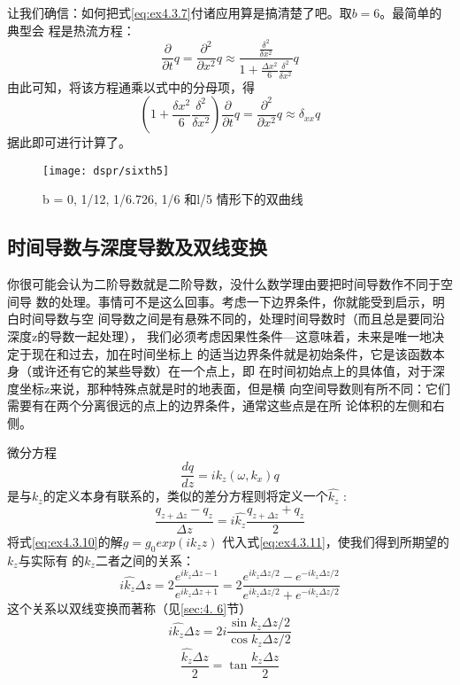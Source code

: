 让我们确信：如何把式\ref{eq:ex4.3.7}付诸应用算是搞清楚了吧。取$b
= 6$。最简单的典型会
程是热流方程：
\begin{equation}
\frac{\partial}{\partial t}q=
\frac{\partial^2}{\partial x^2}q\approx
\frac{\frac{\delta^2}{\delta x^2}}{1+\frac{\Delta x^2}{6}
\frac{\delta^2}{\delta x^2}}q
\label{eq:ex4.3.8}
\end{equation}
由此可知，将该方程通乘以式中的分母项，得
\begin{equation}
(1+\frac{\delta x^2}{6}\frac{\delta^2}{\delta x^2})
\frac{\partial}{\partial t}q=
\frac{\partial^2}{\partial x^2}q\approx
\delta_{xx}q
\label{eq:ex4.3.9}
\end{equation}
据此即可进行计算了。

\begin{figure}[H]
\centering
\texttt{[image: dspr/sixth5]}
\caption[sixth5]{ b = 0, 1/12, 1/6.726, 1/6 和l/5 情形下的双曲线}
\label{fig:dspr/sixth5}
\end{figure}

\subsection{时间导数与深度导数及双线变换}
\label{sec:4.3.4}

你很可能会认为二阶导数就是二阶导数，没什么数学理由要把时间导数作不同于空间导
数的处理。事情可不是这么回事。考虑一下边界条件，你就能受到启示，明白时间导数与空
间导数之间是有悬殊不同的，处理时间导数时（而且总是要同沿深度z的导数一起处理），
我们必须考虑因果性条件---这意味着，未来是唯一地决定于现在和过去，加在时间坐标上
的适当边界条件就是初始条件，它是该函数本身（或许还有它的某些导数）在一个点上，即
在时间初始点上的具体值，对于深度坐标z来说，那种特殊点就是时的地表面，但是横
向空间导数则有所不同：它们需要有在两个分离很远的点上的边界条件，通常这些点是在所
论体积的左侧和右侧。

微分方程
\begin{equation}
\frac{dq}{dz}=ik_z(\omega
,k_x)q
\label{eq:ex4.3.10}
\end{equation}
是与$k_z$的定义本身有联系的，类似的差分方程则将定义一个$\hat{k_z}$ :
\begin{equation}
\frac{q_{z+\Delta z}-q_z}{\Delta z}=i\hat{k_z}
\frac{q_{z+\Delta z}+q_z}{2}
\label{eq:ex4.3.11}
\end{equation}
将式\ref{eq:ex4.3.10}的解$g=g_0exp(ik_zz)$
代入式\ref{eq:ex4.3.11}，使我们得到所期望的$k_z$与实际有
的$k_z$二者之间的关系：
\begin{equation}
i\hat{k_z}\Delta z=
2\frac{e^{ik_z\Delta z-1}}{e^{ik_z\Delta z+1}}=
2\frac{e^{ik_z\Delta z/2}-e^{-ik_z\Delta z/2}}
{e^{ik_z\Delta z/2}+e^{-ik_z\Delta z/2}}
\label{eq:ex4.3.12}
\end{equation}
这个关系以双线变换而著称（见\ref{sec:4. 6}节）
\begin{equation}
i\hat{k_z}\Delta z=2i\frac{\sin k_z\Delta z/2}{\cos k_z\Delta z/2}
\label{eq:ex4.3.13}
\end{equation}
\begin{equation}
\frac{\hat{k_z}\Delta z}{2}=\tan\frac{k_z\Delta z}{2}
\label{eq:ex4.3.14}
\end{equation}

